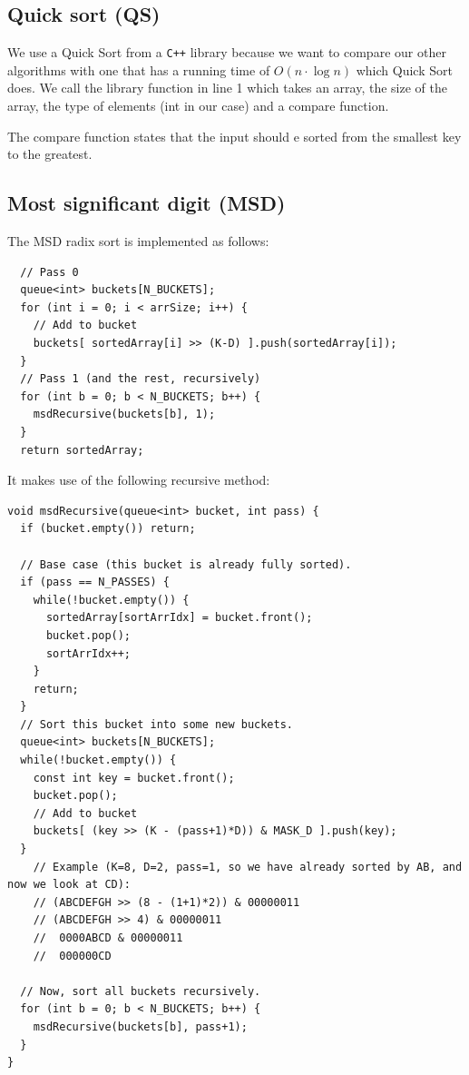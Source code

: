 \subsection{Quick sort (QS)}
We use a Quick Sort from a \verb!C++! library because we want to compare our other algorithms with one that has a running time of $ O(n\cdot \log n) $ which Quick Sort does.
We call the library function in line 1 which takes an array, the size of the array, the type of elements (int in our case) and a compare function.

The compare function states that the input should e sorted from the smallest key to the greatest.

\subsection{Most significant digit (MSD)}

The MSD radix sort is implemented as follows:
\begin{verbatim}
  // Pass 0
  queue<int> buckets[N_BUCKETS];
  for (int i = 0; i < arrSize; i++) {
    // Add to bucket
    buckets[ sortedArray[i] >> (K-D) ].push(sortedArray[i]);
  }
  // Pass 1 (and the rest, recursively)
  for (int b = 0; b < N_BUCKETS; b++) {
    msdRecursive(buckets[b], 1);
  }
  return sortedArray;
\end{verbatim}


It makes use of the following recursive method:
\begin{verbatim}
void msdRecursive(queue<int> bucket, int pass) {
  if (bucket.empty()) return;
  
  // Base case (this bucket is already fully sorted).
  if (pass == N_PASSES) {
    while(!bucket.empty()) {
      sortedArray[sortArrIdx] = bucket.front();
      bucket.pop();
      sortArrIdx++;
    }
    return;
  }
  // Sort this bucket into some new buckets.
  queue<int> buckets[N_BUCKETS];
  while(!bucket.empty()) {
    const int key = bucket.front();
    bucket.pop();
    // Add to bucket
    buckets[ (key >> (K - (pass+1)*D)) & MASK_D ].push(key);
  }
    // Example (K=8, D=2, pass=1, so we have already sorted by AB, and now we look at CD):
    // (ABCDEFGH >> (8 - (1+1)*2)) & 00000011
    // (ABCDEFGH >> 4) & 00000011
    //  0000ABCD & 00000011
    //  000000CD

  // Now, sort all buckets recursively.
  for (int b = 0; b < N_BUCKETS; b++) {
    msdRecursive(buckets[b], pass+1);
  }
}
\end{verbatim}



